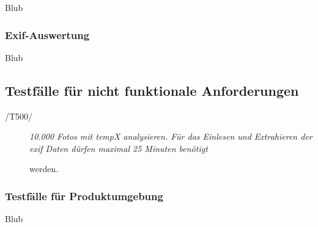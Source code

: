		\begin{description}

			\item[Blub]

		\end{description}
	
	\subsubsection{Exif-Auswertung}
	
		\begin{description}

			\item[Blub]

		\end{description}
	
\subsection{Testfälle für nicht funktionale Anforderungen}
	
	\begin{description}
		
		\item[/T500/]\textit{10.000 Fotos mit \gls{tempX} analysieren. Für das Einlesen und Extrahieren der \gls{exif} Daten dürfen maximal 25 Minuten benötigt}\par werden.
	
	\end{description}

	\subsubsection{Testfälle für Produktumgebung}

		\begin{description}

			\item[Blub]

		\end{description}